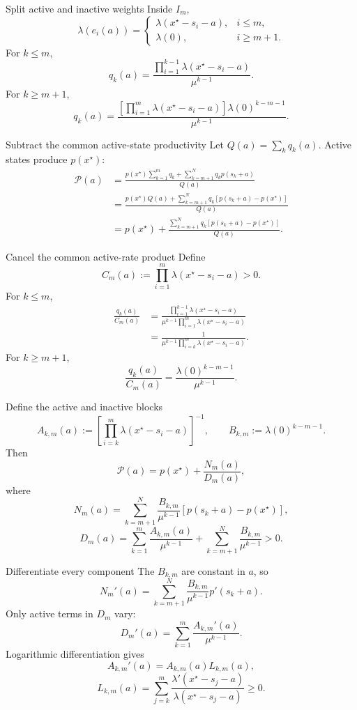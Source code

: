 \documentclass[aspectratio=169,10pt]{beamer}
\newcommand{\calP}{\mathcal{P}}
\begin{document}
\begin{frame}{Split active and inactive weights}
Inside $I_m$,
\[
\lambda(e_i(a))=
\begin{cases}
\lambda(x^\star-s_i-a),&i\le m,\\
\lambda(0),&i\ge m+1.
\end{cases}
\]
For $k\le m$,
\[
q_k(a)=
\frac{
\prod_{i=1}^{k-1}
\lambda(x^\star-s_i-a)}
{\mu^{k-1}}.
\]
For $k\ge m+1$,
\[
q_k(a)=
\frac{
\left[\prod_{i=1}^{m}
\lambda(x^\star-s_i-a)\right]
\lambda(0)^{k-m-1}}
{\mu^{k-1}}.
\]
\end{frame}

\begin{frame}{Subtract the common active-state productivity}
Let $Q(a)=\sum_kq_k(a)$. Active states produce $p(x^\star)$:
\begin{align*}
\calP(a)
&=
\frac{
p(x^\star)\sum_{k=1}^mq_k
+\sum_{k=m+1}^Nq_kp(s_k+a)}
{Q(a)}\\
&=
\frac{
p(x^\star)Q(a)
+\sum_{k=m+1}^Nq_k
[p(s_k+a)-p(x^\star)]}
{Q(a)}\\
&=
p(x^\star)
+
\frac{
\sum_{k=m+1}^Nq_k
[p(s_k+a)-p(x^\star)]}
{Q(a)}.
\end{align*}
\end{frame}

\begin{frame}{Cancel the common active-rate product}
Define
\[
C_m(a):=
\prod_{i=1}^m
\lambda(x^\star-s_i-a)>0.
\]
For $k\le m$,
\begin{align*}
\frac{q_k(a)}{C_m(a)}
&=
\frac{
\prod_{i=1}^{k-1}\lambda(x^\star-s_i-a)}
{\mu^{k-1}
\prod_{i=1}^{m}\lambda(x^\star-s_i-a)}\\
&=
\frac{1}{
\mu^{k-1}
\prod_{i=k}^{m}\lambda(x^\star-s_i-a)}.
\end{align*}
For $k\ge m+1$,
\[
\frac{q_k(a)}{C_m(a)}
=
\frac{\lambda(0)^{k-m-1}}{\mu^{k-1}}.
\]
\end{frame}

\begin{frame}{Define the active and inactive blocks}
\small
\[
A_{k,m}(a):=
\left[
\prod_{i=k}^{m}
\lambda(x^\star-s_i-a)
\right]^{-1},
\qquad
B_{k,m}:=\lambda(0)^{k-m-1}.
\]
Then
\[
\boxed{
\calP(a)=p(x^\star)+
\frac{N_m(a)}{D_m(a)},}
\]
where
\[
N_m(a)=
\sum_{k=m+1}^{N}
\frac{B_{k,m}}{\mu^{k-1}}
[p(s_k+a)-p(x^\star)],
\]
\[
D_m(a)=
\sum_{k=1}^{m}
\frac{A_{k,m}(a)}{\mu^{k-1}}
+
\sum_{k=m+1}^{N}
\frac{B_{k,m}}{\mu^{k-1}}>0.
\]
\end{frame}

\begin{frame}{Differentiate every component}
The $B_{k,m}$ are constant in $a$, so
\[
N_m'(a)=
\sum_{k=m+1}^N
\frac{B_{k,m}}{\mu^{k-1}}
p'(s_k+a).
\]
Only active terms in $D_m$ vary:
\[
D_m'(a)=
\sum_{k=1}^m
\frac{A_{k,m}'(a)}{\mu^{k-1}}.
\]
Logarithmic differentiation gives
\[
A_{k,m}'(a)=A_{k,m}(a)L_{k,m}(a),
\]
\[
L_{k,m}(a)=
\sum_{j=k}^m
\frac{\lambda'(x^\star-s_j-a)}
{\lambda(x^\star-s_j-a)}\ge0.
\]
\end{frame}
\end{document}

